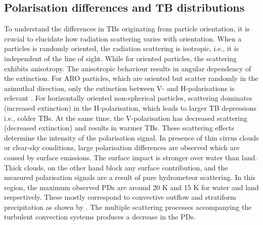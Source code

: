 \documentclass[amt, manuscript]{copernicus}
\begin{document}
\subsection{Polarisation differences and TB distributions}
%
To understand the differences in TBs originating from particle orientation, it is crucial to elucidate how radiation scattering varies with orientation. When a particles is randomly oriented, the radiation scattering is isotropic, i.e., it is independent of the line of sight. While for oriented particles, the scattering exhibits anisotropy. The anisotropic behaviour results in angular dependency of the extinction. For ARO particles, which are oriented but scatter randomly in the azimuthal direction, only the extinction between V- and H-polarisations is relevant \citep{brath:micro:20, barlakas:intro:21}. For horizontally oriented non-spherical particles, scattering dominates (increased extinction) in the H-polarisation, which leads to larger TB depressions i.e., colder TBs. At the same time, the V-polarisation has decreased scattering (decreased extinction) and results in warmer TBs. These scattering effects determine the intensity of the polarisation signal. In presence of thin cirrus clouds or clear-sky conditions, large polarisation differences are observed which are caused by surface emissions. The surface impact is stronger over water than land. Thick clouds, on the other hand block any surface contribution, and the measured polarisation signals are a result of pure hydrometeor scattering. In this region, the maximum observed PDs  are around 20\,\,K and 15\,\,K for  water and land respectively. These mostly correspond to convective outflow and stratiform precipitation as shown by \citet{gong:micro:17}. The multiple scattering processes accompanying the turbulent convection systems produces a decrease in the PDs.
\end{document}
